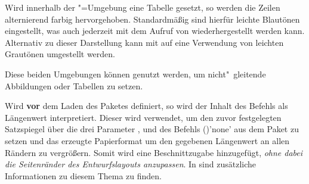 \begin{Bundle*}{}
\begin{Declaration}{}
\begin{Declaration}{}
\begin{Declaration}{}
\printdeclarationlist%
%
Wird innerhalb der "=Umgebung eine Tabelle gesetzt, 
so werden die Zeilen alternierend farbig hervorgehoben. Standardmäßig sind 
hierfür leichte Blautönen eingestellt, was auch jederzeit mit dem Aufruf von 
 wiederhergestellt werden kann. Alternativ zu dieser 
Darstellung kann mit  auf eine Verwendung von leichten 
Grautönen umgestellt werden.
\end{Declaration}
\end{Declaration}
\end{Declaration}

\begin{Declaration}{}
\begin{Declaration}{}
\printdeclarationlist%
%
Diese beiden Umgebungen können genutzt werden, um nicht"~gleitende Abbildungen 
oder Tabellen zu setzen.
\end{Declaration}
\end{Declaration}

\begin{Declaration}{}
\printdeclarationlist%
%
Wird  \textbf{vor} dem Laden des Paketes 
definiert, so wird der Inhalt des Befehls als Längenwert interpretiert. Dieser 
wird verwendet, um den zuvor festgelegten Satzspiegel über die drei Parameter
,
 und 
 des
Befehls ()'none' aus dem Paket 
 zu setzen und das erzeugte Papierformat um den gegebenen 
Längenwert an allen Rändern zu vergrößern. Somit wird eine Beschnittzugabe 
hinzugefügt, \emph{ohne dabei die Seitenränder des Entwurfslayouts anzupassen}. 
In  sind zusätzliche Informationen zu diesem Thema zu 
finden.
\end{Declaration}
%
\end{Bundle*}
